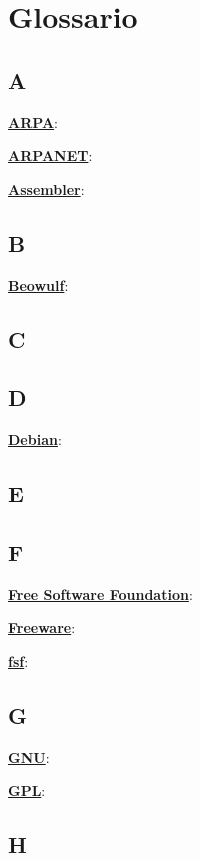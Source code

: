 \section{Glossario}

\subsection*{A}

\underline{\textbf{ARPA}}: %

\underline{\textbf{ARPANET}}: %

\underline{\textbf{Assembler}}: %

\subsection*{B}

\underline{\textbf{Beowulf}}: %

\subsection*{C}

\subsection*{D}

\underline{\textbf{Debian}}: %

\subsection*{E}

\subsection*{F}

\underline{\textbf{Free Software Foundation}}: %

\underline{\textbf{Freeware}}: %

\underline{\textbf{fsf}}: %

\subsection*{G}

\underline{\textbf{GNU}}: %

\underline{\textbf{GPL}}: %

\subsection*{H}

